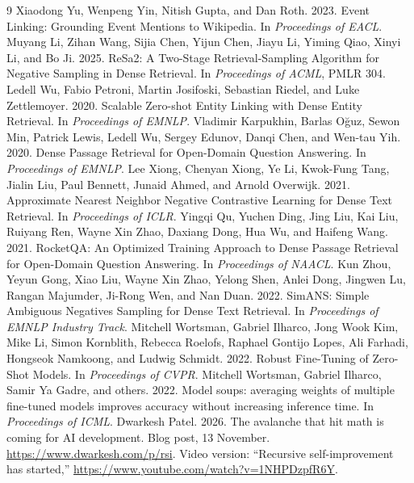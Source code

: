 \documentclass[11pt]{article}
\theoremstyle{definition}
\begin{document}
\begin{thebibliography}{9}
 Xiaodong Yu, Wenpeng Yin, Nitish Gupta, and Dan Roth. 2023. Event Linking: Grounding Event Mentions to Wikipedia. In \emph{Proceedings of EACL}.
 Muyang Li, Zihan Wang, Sijia Chen, Yijun Chen, Jiayu Li, Yiming Qiao, Xinyi Li, and Bo Ji. 2025. ReSa2: A Two-Stage Retrieval-Sampling Algorithm for Negative Sampling in Dense Retrieval. In \emph{Proceedings of ACML}, PMLR 304.
 Ledell Wu, Fabio Petroni, Martin Josifoski, Sebastian Riedel, and Luke Zettlemoyer. 2020. Scalable Zero-shot Entity Linking with Dense Entity Retrieval. In \emph{Proceedings of EMNLP}.
 Vladimir Karpukhin, Barlas O\u{g}uz, Sewon Min, Patrick Lewis, Ledell Wu, Sergey Edunov, Danqi Chen, and Wen-tau Yih. 2020. Dense Passage Retrieval for Open-Domain Question Answering. In \emph{Proceedings of EMNLP}.
 Lee Xiong, Chenyan Xiong, Ye Li, Kwok-Fung Tang, Jialin Liu, Paul Bennett, Junaid Ahmed, and Arnold Overwijk. 2021. Approximate Nearest Neighbor Negative Contrastive Learning for Dense Text Retrieval. In \emph{Proceedings of ICLR}.
 Yingqi Qu, Yuchen Ding, Jing Liu, Kai Liu, Ruiyang Ren, Wayne Xin Zhao, Daxiang Dong, Hua Wu, and Haifeng Wang. 2021. RocketQA: An Optimized Training Approach to Dense Passage Retrieval for Open-Domain Question Answering. In \emph{Proceedings of NAACL}.
 Kun Zhou, Yeyun Gong, Xiao Liu, Wayne Xin Zhao, Yelong Shen, Anlei Dong, Jingwen Lu, Rangan Majumder, Ji-Rong Wen, and Nan Duan. 2022. SimANS: Simple Ambiguous Negatives Sampling for Dense Text Retrieval. In \emph{Proceedings of EMNLP Industry Track}.
 Mitchell Wortsman, Gabriel Ilharco, Jong Wook Kim, Mike Li, Simon Kornblith, Rebecca Roelofs, Raphael Gontijo Lopes, Ali Farhadi, Hongseok Namkoong, and Ludwig Schmidt. 2022. Robust Fine-Tuning of Zero-Shot Models. In \emph{Proceedings of CVPR}.
 Mitchell Wortsman, Gabriel Ilharco, Samir Ya Gadre, and others. 2022. Model soups: averaging weights of multiple fine-tuned models improves accuracy without increasing inference time. In \emph{Proceedings of ICML}.
 Dwarkesh Patel. 2026. The avalanche that hit math is coming for AI development. Blog post, 13 November. \url{https://www.dwarkesh.com/p/rsi}. Video version: ``Recursive self-improvement has started,'' \url{https://www.youtube.com/watch?v=1NHPDzpfR6Y}.
\end{thebibliography}
\end{document}
